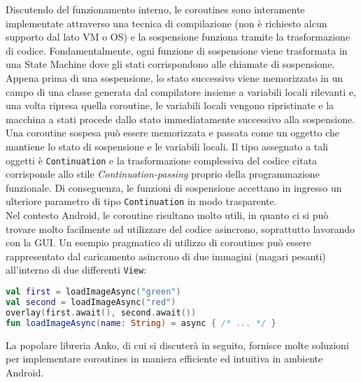 Discutendo del funzionamento interno, le coroutines sono interamente implementate attraverso una tecnica di compilazione (non è richiesto alcun supporto dal lato VM o OS) e la sospensione funziona tramite la trasformazione di codice. Fondamentalmente, ogni funzione di sospensione viene trasformata in una State Machine dove gli stati corrispondono alle chiamate di sospensione. Appena prima di una sospensione, lo stato successivo viene memorizzato in un campo di una classe generata dal compilatore insieme a variabili locali rilevanti e, una volta ripresa quella coroutine, le variabili locali vengono ripristinate e la macchina a stati procede dallo stato immediatamente successivo alla sospensione. Una coroutine sospesa può essere memorizzata e passata come un oggetto che mantiene lo stato di sospensione e le variabili locali. Il tipo assegnato a tali oggetti è \texttt{Continuation} e la trasformazione complessiva del codice citata corrisponde allo stile {\em Continuation-passing} proprio della programmazione funzionale. Di conseguenza, le funzioni di sospensione accettano in ingresso un ulteriore parametro di tipo \texttt{Continuation} in modo trasparente.\\

Nel contesto Android, le coroutine risultano molto utili, in quanto ci si può trovare molto facilmente ad utilizzare del codice asincrono, soprattutto lavorando con la GUI. Un esempio pragmatico di utilizzo di coroutines può essere rappresentato dal caricamento asincrono di due immagini (magari pesanti) all'interno di due differenti \texttt{View}:\\

\begin{lstlisting}[caption={Utilizzo di funzioni di libreria per Coroutines in Android}, captionpos=b, label={lst:exAmpleAsyncView}, language=Kotlin]
val first = loadImageAsync("green")
val second = loadImageAsync("red")
overlay(first.await(), second.await())
fun loadImageAsync(name: String) = async { /* ... */ }
\end{lstlisting}

La popolare libreria Anko, di cui si discuterà in seguito, fornisce molte soluzioni per implementare coroutines in maniera efficiente ed intuitiva in ambiente Android.\\

